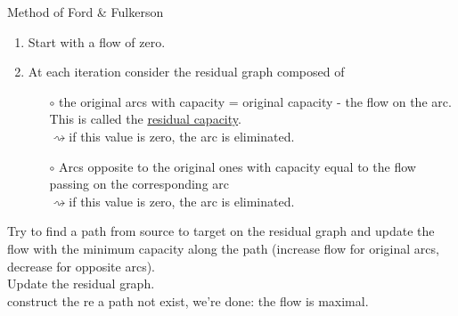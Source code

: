 \documentclass[10pt]{report}
\makeatletter
\numberwithin{dummy}{section}
\theoremstyle{ocrenumbox}
\theoremstyle{grayman}
\renewcommand{\section}{\@startsection{section}{1}{\z@}
{-4ex \@plus -1ex \@minus -.4ex}
{1ex \@plus.2ex }
{\normalfont\large\sffamily\bfseries}}
\makeatother
\begin{document}
\section{Method of Ford \& Fulkerson}
\begin{enumerate}
    \item Start with a flow of zero.
    \item At each iteration consider the residual graph composed of \begin{itemize}
        \item[$\circ$] the original arcs with capacity = original capacity - the flow on the arc.\\ This is called the \underline{residual capacity}. \\
        $\rightsquigarrow$if this value is zero, the arc is eliminated.
        \item[$\circ$] Arcs opposite to the original ones with capacity equal to the flow passing on the corresponding arc \\
        $\rightsquigarrow$if this value is zero, the arc is eliminated.
    \end{itemize}

\end{enumerate}
Try to find a path from source to target on the residual graph
and update the flow with the minimum capacity along the
path (increase flow for original arcs, decrease for opposite
arcs).\\ Update the residual graph.\\
construct the re a path not exist, we’re done: the flow is maximal. \\
\begin{center}
\end{center}
\end{document}
